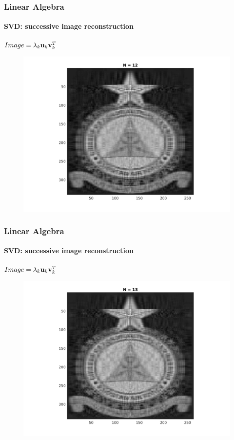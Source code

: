 \documentclass[hyperref={pdfpagelabels=true}]{beamer}
\begin{document}
\begin{frame}
\frametitle{Linear Algebra}
\framesubtitle{SVD: successive image reconstruction} 
\small{
\begin{center}
$Image = \lambda_k{\bf u}_k {\bf v}_k^T$
\end{center}}
\begin{figure}[!htb]
\centering
\includegraphics [scale=0.48]{n/b12.png}
\end{figure}
\end{frame}

\begin{frame}
\frametitle{Linear Algebra}
\framesubtitle{SVD: successive image reconstruction} 
\small{
\begin{center}
$Image = \lambda_k{\bf u}_k {\bf v}_k^T$
\end{center}}
\begin{figure}[!htb]
\centering
\includegraphics [scale=0.48]{n/b13.png}
\end{figure}
\end{frame}
\end{document}
